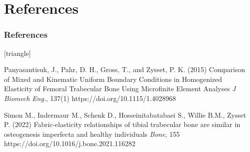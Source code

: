 \documentclass[xcolor=table,11pt]{beamer}
\begin{document}
	\section{References}

	\begin{frame}
		\frametitle{References}
		\footnotesize{
				\begin{thebibliography}{99}
						[triangle]
						
						 Panyasantisuk, J., Pahr, D. H., Gross, T., and Zysset, P. K. (2015)
						\newblock Comparison of Mixed and Kinematic Uniform Boundary Conditions in Homogenized Elasticity of Femoral Trabecular Bone Using Microfinite Element Analyses
						\newblock \textit{J Biomech Eng.}, 137(1)
						\newblock https://doi.org/10.1115/1.4028968

						Simon M., Indermaur M., Schenk D., Hosseinitabatabaei S., Willie B.M., Zysset P. (2022)
						\newblock Fabric-elasticity relationships of tibial trabecular bone are similar in osteogenesis imperfecta and healthy individuals
						\newblock \textit{Bone}, 155
						\newblock https://doi.org/10.1016/j.bone.2021.116282
						
					\end{thebibliography}
			}
	\end{frame}
	
\end{document}

